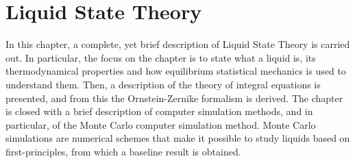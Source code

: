 \chapter{Liquid State Theory}
\label{Cap2}

In this chapter, a complete, yet brief description of Liquid State
Theory is carried out. In particular, the focus on the chapter is
to state what a liquid is, its thermodynamical properties and
how equilibrium statistical mechanics is used to understand them.
Then, a description of the theory of integral equations is presented,
and from this the Ornstein-Zernike formalism is derived.
The chapter is closed with a brief description of computer simulation
methods, and in particular, of the Monte Carlo computer simulation
method. Monte Carlo simulations are numerical schemes that make it
possible to study liquids based on first-principles, from which
a baseline result is obtained.